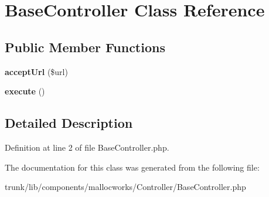\hypertarget{class_base_controller}{
\section{BaseController Class Reference}
\label{class_base_controller}
}
\subsection*{Public Member Functions}
\begin{DoxyCompactItemize}
\item 
\hypertarget{class_base_controller_ab21384ad1f3d3af286fca906ed5554d8}{
{\bfseries acceptUrl} (\$url)}
\label{class_base_controller_ab21384ad1f3d3af286fca906ed5554d8}

\item 
\hypertarget{class_base_controller_a1909f4b7f8129c7790cb75de2ffbe1e4}{
{\bfseries execute} ()}
\label{class_base_controller_a1909f4b7f8129c7790cb75de2ffbe1e4}

\end{DoxyCompactItemize}


\subsection{Detailed Description}


Definition at line 2 of file BaseController.php.



The documentation for this class was generated from the following file:\begin{DoxyCompactItemize}
\item 
trunk/lib/components/mallocworks/Controller/BaseController.php\end{DoxyCompactItemize}
